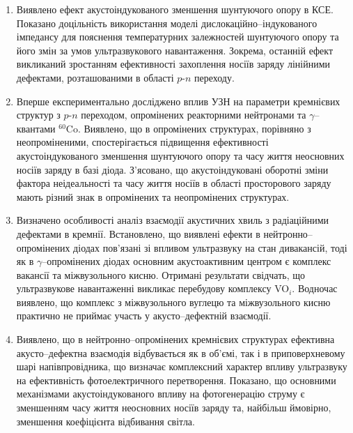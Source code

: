 \begin{enumerate}[leftmargin=0cm,itemindent=3em]
     \item Виявлено ефект акустоіндукованого зменшення шунтуючого опору в КСЕ.
      Показано доцільність використання моделі дислокаційно--індукованого імпедансу для пояснення температурних залежностей шунтуючого опору та його змін за умов ультразвукового навантаження.
      Зокрема, останній ефект викликаний зростанням ефективності захоплення носіїв заряду лінійними дефектами,
      розташованими в області $p$-$n$ переходу.



     \item Вперше експериментально досліджено вплив УЗН на параметри кремнієвих структур з $p$-$n$ переходом, опромінених  реакторними нейтронами та $\gamma$--квантами $^{60}$Co.
      Виявлено, що в опромінених структурах, порівняно з неопроміненими, спостерігається підвищення ефективності акустоіндукованого зменшення шунтуючого опору та часу життя неосновних носіїв заряду в базі діода.
      З'ясовано, що акустоіндуковані оборотні зміни фактора неідеальності та часу життя носіїв в області просторового заряду   мають різний знак в опромінених та неопромінених структурах.

      \item Визначено особливості аналіз взаємодії акустичних хвиль з радіаційними дефектами в кремнії.
      Встановлено, що виявлені ефекти в нейтронно--опромінених діодах пов'язані зі впливом ультразвуку на стан дивакансій,  тоді як в $\gamma$--опромінених діодах основним акустоактивним центром є комплекс вакансії та міжвузольного кисню.
     Отримані результати свідчать, що ультразвукове навантаженні викликає перебудову комплексу VO$_i$.
     Водночас виявлено, що комплекс з міжвузольного вуглецю та міжвузольного кисню практично не приймає участь у
     акусто--дефектній взаємодії.


     \item Виявлено, що в нейтронно--опромінених кремнієвих структурах ефективна акусто--дефектна
     взаємодія відбувається як в об'ємі, так і в приповерхневому шарі напівпровідника, що
визначає комплексний характер впливу ультразвуку на ефективність фотоелектричного перетворення.
Показано, що основними механізмами акустоіндукованого впливу на фотогенерацію струму є зменшенням часу життя неосновних носіїв заряду та,
найбільш ймовірно, зменшення коефіцієнта відбивання світла.
  \end{enumerate}	

